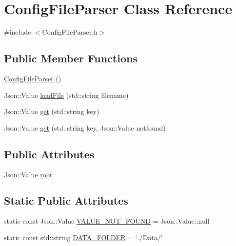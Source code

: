 \hypertarget{classConfigFileParser}{\section{Config\-File\-Parser Class Reference}
\label{classConfigFileParser}
}


{\ttfamily \#include $<$Config\-File\-Parser.\-h$>$}

\subsection*{Public Member Functions}
\begin{DoxyCompactItemize}
\item 
\hyperlink{classConfigFileParser_ababdbb96452d3e39677e434b3439f6df}{Config\-File\-Parser} ()
\item 
Json\-::\-Value \hyperlink{classConfigFileParser_a367a634885b1877e5d50fcafcf36cc82}{load\-File} (std\-::string filename)
\item 
Json\-::\-Value \hyperlink{classConfigFileParser_a274bffad1419f68e46b0122ee39073a0}{get} (std\-::string key)
\item 
Json\-::\-Value \hyperlink{classConfigFileParser_a5ed322c51117f33eb8e871374b26f065}{get} (std\-::string key, Json\-::\-Value notfound)
\end{DoxyCompactItemize}
\subsection*{Public Attributes}
\begin{DoxyCompactItemize}
\item 
Json\-::\-Value \hyperlink{classConfigFileParser_a61cfe04569f4b8864352068cf1a60475}{root}
\end{DoxyCompactItemize}
\subsection*{Static Public Attributes}
\begin{DoxyCompactItemize}
\item 
static const Json\-::\-Value \hyperlink{classConfigFileParser_a3f5b477413c70e4364d68345ebec52a1}{V\-A\-L\-U\-E\-\_\-\-N\-O\-T\-\_\-\-F\-O\-U\-N\-D} = Json\-::\-Value\-::null
\item 
static const std\-::string \hyperlink{classConfigFileParser_a03d130795beded6ace2b5d9b2e120216}{D\-A\-T\-A\-\_\-\-F\-O\-L\-D\-E\-R} = \char`\"{}./Data/\char`\"{}
\end{DoxyCompactItemize}


